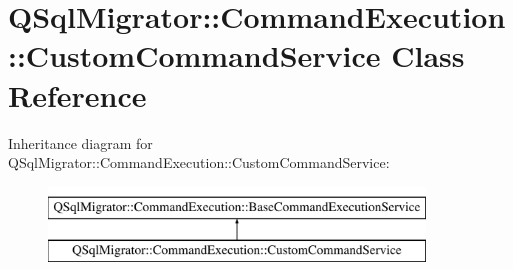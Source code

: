 \hypertarget{class_q_sql_migrator_1_1_command_execution_1_1_custom_command_service}{}\section{Q\+Sql\+Migrator\+:\+:Command\+Execution\+:\+:Custom\+Command\+Service Class Reference}
\label{class_q_sql_migrator_1_1_command_execution_1_1_custom_command_service}
Inheritance diagram for Q\+Sql\+Migrator\+:\+:Command\+Execution\+:\+:Custom\+Command\+Service\+:\begin{figure}[H]
\begin{center}
\leavevmode
\includegraphics[height=2.000000cm]{class_q_sql_migrator_1_1_command_execution_1_1_custom_command_service}
\end{center}
\end{figure}
